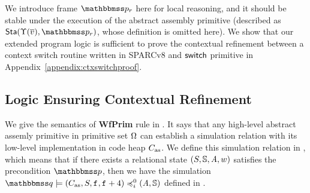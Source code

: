We introduce frame $\relastP_r$ here for local reasoning, 
and it should be stable under the execution 
of the abstract assembly primitive
(described as $\Sta(\hprim(\args{\val}), \relastP_r)$, 
whose definition is omitted here). 
We show that our extended program logic is sufficient 
to prove the contextual refinement between 
a context switch routine written in SPARCv8
and $\mathsf{switch}$ primitive 
in Appendix~\ref{appendix:ctxswitchproof}. 
\subsection{Logic Ensuring Contextual Refinement}
\label{subsec:logic-ensuring-ctxrefinement}

We give the semantics of \textbf{WfPrim} rule in 
\Def{\ref{def:wdprim-sem}}. 
It says that any high-level abstract assemly primitive 
in primitive set $\Omega$ can 
establish a simulation relation with its low-level 
implementation in code heap $C_{\text{as}}$. We define this 
simulation relation in \Def{\ref{def:sim-impl-prim}}, 
which means that if there 
exists a relational state $(S, \mathbb{S}, \textit{A}, w)$ 
satisfies the precondition $\relastP$, then we have 
the simulation 
$\simFunctionSt{\relastQ}{(\asmimp, \state, \lab{}, \lab{} + 4)}
    {i}{0}{(\primcom, \hpstate)}$ defined in 
\Def{\ref{def:sim-imp-prim-state}}. 

